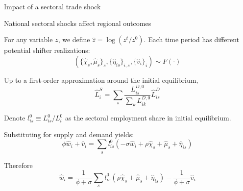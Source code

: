 \documentclass[11pt,notes=hide,aspectratio=169]{beamer}
\begin{document}
\begin{frame}{Impact of a sectoral trade shock}
\begin{center}
\end{center}
\end{frame}
\begin{frame}{National sectoral shocks affect regional outcomes}
\begin{itemize}{\small
    \item For any variable $z$, we define $\hat{z}=\log(z^{t}/z^{0})$. Each time period has different potential shifter realizations:
    $$ (\{\hat{\chi}_{s},\hat{\mu}_{s}\}_{s},\{\hat{\eta}_{is}\}_{i,s},\{\hat{v}_{i}\}_{i})\sim F(\cdot) $$
    \item Up to a first-order approximation around the initial equilibrium,
    $$\hat{L}_{i}^{S}= \sum_{s} \frac{L_{is}^{D,0}}{\sum_{k} L_{ik}^{D,0}} \hat{L}_{is}^{D}$$
    \item Denote $l_{is}^{0}\equiv L_{is}^{0}/L_{i}^{0}$ as the sectoral employment share in initial equilibrium.
    \item Substituting for supply and demand yields:
   $$ \phi\hat{w}_{i}+\hat{v}_{i}=\sum_{s}l_{is}^{0}(-\sigma\hat{w}_{i}+\rho\hat{\chi}_{s}+\hat{\mu}_{s}+\hat{\eta}_{is}) $$
    \item Therefore
    $$ \hat{w}_{i}=\frac{1}{\phi+\sigma}\sum_{s}l_{is}^{0}(\rho\hat{\chi}_{s}+\hat{\mu}_{s}+\hat{\eta}_{is})-\frac{1}{\phi+\sigma}\hat{v}_{i} $$
}\end{itemize}
\end{frame}
\end{document}
